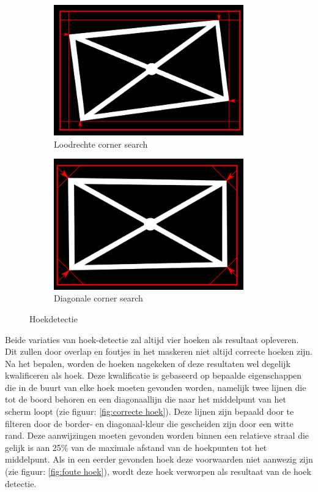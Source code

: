 \begin{figure}[H] 
\centering
\begin{subfigure}{0.5\textwidth}
\centering
\includegraphics[width=0.9\textwidth]{img/perpSearch.png}
\caption{Loodrechte corner search}
\label{fig:perp search}
\end{subfigure}%
\begin{subfigure}{0.5\textwidth}
\centering
\includegraphics[width=0.9\textwidth]{img/diagSearch.png}
\caption{Diagonale corner search}
\label{fig:diag search}
\end{subfigure}
\caption{Hoekdetectie}
\end{figure}

\noindent
Beide variaties van hoek-detectie zal altijd vier hoeken als resultaat opleveren. Dit zullen door overlap en foutjes in het maskeren niet altijd correcte hoeken zijn. Na het bepalen, worden de hoeken nagekeken of deze resultaten wel degelijk kwalificeren als hoek. Deze kwalificatie is gebaseerd op bepaalde eigenschappen die in de buurt van elke hoek moeten gevonden worden, namelijk twee lijnen die tot de boord behoren en een diagonaallijn die naar het middelpunt van het scherm loopt (zie figuur: \ref{fig:correcte hoek}). Deze lijnen zijn bepaald door te filteren door de border- en diagonaal-kleur die gescheiden zijn door een witte rand. Deze aanwijzingen moeten gevonden worden binnen een relatieve straal die gelijk is aan 25\% van de maximale afstand van de hoekpunten tot het middelpunt. Als in een eerder gevonden hoek deze voorwaarden niet aanwezig zijn (zie figuur: \ref{fig:foute hoek}), wordt deze hoek verworpen als resultaat van de hoek detectie.


